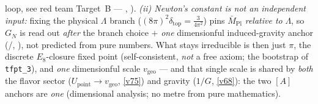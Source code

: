 loop, see red team Target~B --- , ).
\emph{(ii) Newton's constant is not an \emph{independent} input:} fixing the physical $\Lambda$ branch
($(8\pi)^2\delta_{\mathrm{top}}=\tfrac{3}{4\pi^2}$) pins $\bar M_{\mathrm{Pl}}$ \emph{relative to} $\Lambda$, so
$G_N$ is read out \emph{after} the branch choice $+$ \emph{one} dimensionful induced-gravity anchor (\mE/\mC,
), not predicted from pure numbers. What stays irreducible is then
just $\pi$, the discrete $E_8$-closure fixed point (self-consistent, \emph{not} a free axiom; the bootstrap of
\texttt{tfpt\_3}), and \emph{one} dimensionful scale $v_{\mathrm{geo}}$ --- and that single scale is shared by
\emph{both} the flavor sector ($U_{\mathrm{point}}\to v_{\mathrm{geo}}$, \vref{v75}) and gravity ($1/G$, \vref{v68}): the two
$[A]$ anchors are \emph{one} (dimensional analysis; no metre from pure mathematics).

